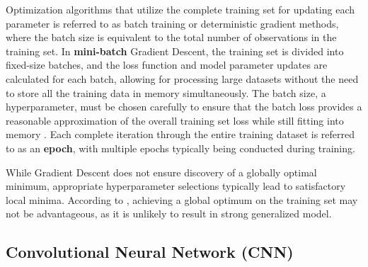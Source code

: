 Optimization algorithms that utilize the complete training set for updating each parameter is referred to as batch training or deterministic gradient methods, where the batch size is equivalent to the total number of observations in the training set. In \textbf{mini-batch} Gradient Descent, the training set is divided into fixed-size batches, and the loss function and model parameter updates are calculated for each batch, allowing for processing large datasets without the need to store all the training data in memory simultaneously. The batch size, a hyperparameter, must be chosen carefully to ensure that the batch loss provides a reasonable approximation of the overall training set loss while still fitting into memory \cite{Bishop2023}. Each complete iteration through the entire training dataset is referred to as an \textbf{epoch}, with multiple epochs typically being conducted during training. 



While Gradient Descent does not ensure discovery of a globally optimal minimum, appropriate hyperparameter selections typically lead to satisfactory local minima. According to \textcite{Choromanska2014}, achieving a global optimum on the training set may not be advantageous, as it is unlikely to result in strong generalized model.


\subsection{Convolutional Neural Network (CNN)}
\label{subsec:convolutional_neural_network_CNN}

